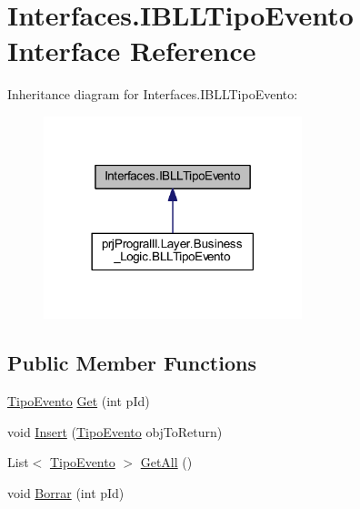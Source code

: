 \hypertarget{interface_interfaces_1_1_i_b_l_l_tipo_evento}{}\section{Interfaces.\+I\+B\+L\+L\+Tipo\+Evento Interface Reference}
\label{interface_interfaces_1_1_i_b_l_l_tipo_evento}


Inheritance diagram for Interfaces.\+I\+B\+L\+L\+Tipo\+Evento\+:
\nopagebreak
\begin{figure}[H]
\begin{center}
\leavevmode
\includegraphics[width=213pt]{interface_interfaces_1_1_i_b_l_l_tipo_evento__inherit__graph}
\end{center}
\end{figure}
\subsection*{Public Member Functions}
\begin{DoxyCompactItemize}
\item 
\hyperlink{classprj_progra_i_i_i_1_1_layer_1_1_entities_1_1_tipo_evento}{Tipo\+Evento} \hyperlink{interface_interfaces_1_1_i_b_l_l_tipo_evento_afa587820875ec8c611cb628c33a3a274}{Get} (int p\+Id)
\item 
void \hyperlink{interface_interfaces_1_1_i_b_l_l_tipo_evento_abe3b18cdc875d0c08853478dd9720af4}{Insert} (\hyperlink{classprj_progra_i_i_i_1_1_layer_1_1_entities_1_1_tipo_evento}{Tipo\+Evento} obj\+To\+Return)
\item 
List$<$ \hyperlink{classprj_progra_i_i_i_1_1_layer_1_1_entities_1_1_tipo_evento}{Tipo\+Evento} $>$ \hyperlink{interface_interfaces_1_1_i_b_l_l_tipo_evento_a9491bc76d279f88a5f33ce3a63c84302}{Get\+All} ()
\item 
void \hyperlink{interface_interfaces_1_1_i_b_l_l_tipo_evento_a6ef15f72eee8239388905aed3c4d3ad5}{Borrar} (int p\+Id)
\end{DoxyCompactItemize}



